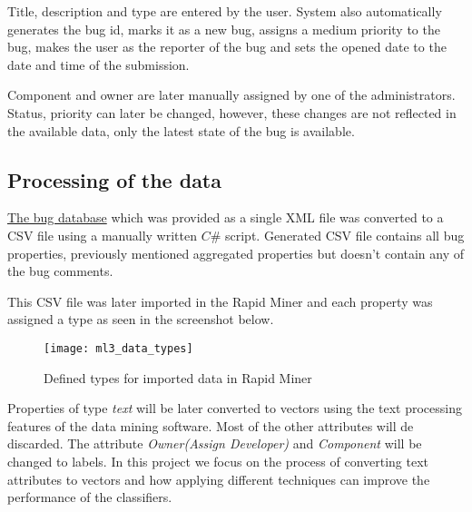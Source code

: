 Title, description and type are entered by the user. System also automatically generates the bug id, marks it as a new bug, assigns a medium priority to the bug, makes the user as the reporter of the bug and sets the opened date to the date and time of the submission.

Component and owner are later manually assigned by one of the administrators. Status, priority can later be changed, however, these changes are not reflected in the available data, only the latest state of the bug is available.

\subsection*{Processing of the data} %

\href{http://2012.msrconf.org/challenge_data/android_platform_bugs.rar}{The bug database}
which was provided as a single XML file was converted to a CSV file using a manually written $C\#$ script. Generated CSV file contains all bug properties, previously mentioned aggregated properties but doesn't contain any of the bug comments.

This CSV file was later imported in the Rapid Miner and each property was assigned a type as seen in the screenshot below.

\begin{figure}
\begin{center}
\texttt{[image: ml3\_data\_types]}
\caption{Defined types for imported data in Rapid Miner}
\end{center}
\end{figure}

Properties of type {\it text} will be later converted to vectors using the text processing features of the data mining software.
Most of the other attributes will de discarded. The attribute {\it Owner(Assign Developer)} and {\it Component} will be changed to labels. In this project we focus on the process of converting text attributes to vectors and how applying different techniques can improve the performance of the classifiers.

